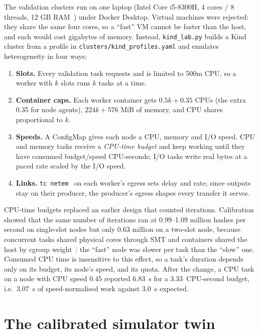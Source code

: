 \documentclass[12pt,a4paper]{report}
\begin{document}
The validation clusters run on one laptop (Intel Core i5-8300H, 4 cores /
8 threads, 12 GB RAM~\cite{intel-i5-8300h}) under Docker Desktop. Virtual
machines were rejected: they share the same four cores, so a ``fast'' VM
cannot be faster than the host, and each would cost gigabytes of memory.
Instead, \texttt{kind\_lab.py} builds a Kind cluster from a profile in
\texttt{clusters/kind\_profiles.yaml} and emulates heterogeneity in four
ways:

\begin{enumerate}
\item \textbf{Slots.} Every validation task requests and is limited to
      500m CPU, so a worker with $k$ slots runs $k$ tasks at a time.
\item \textbf{Container caps.} Each worker container gets
      $0.5k + 0.35$ CPUs (the extra 0.35 for node agents), $224k + 576$
      MiB of memory, and CPU shares proportional to $k$.
\item \textbf{Speeds.} A ConfigMap gives each node a CPU, memory and I/O
      speed. CPU and memory tasks receive a \emph{CPU-time budget} and keep
      working until they have consumed budget$/$speed CPU-seconds; I/O
      tasks write real bytes at a paced rate scaled by the I/O speed.
\item \textbf{Links.} \texttt{tc netem}~\cite{hemminger2005netem} on each
      worker's egress sets delay and rate; since outputs stay on their
      producer, the producer's egress shapes every transfer it serves.
\end{enumerate}

CPU-time budgets replaced an earlier design that counted iterations.
Calibration showed that the same number of iterations ran at 0.99--1.09
million hashes per second on single-slot nodes but only 0.63 million on a
two-slot node, because concurrent tasks shared physical cores through SMT
and containers shared the host by cgroup weight~\cite{cgroup-v2}: the
``fast'' node was slower per task than the ``slow'' one. Consumed CPU time
is insensitive to this effect, so a task's duration depends only on its
budget, its node's speed, and its quota. After the change, a CPU task
on a node with CPU speed 0.45 reported 6.83~s for a 3.33~CPU-second
budget, i.e.\ 3.07~s of speed-normalised work against 3.0~s expected.

\section{The calibrated simulator twin}
\label{sec:twin}
\end{document}
